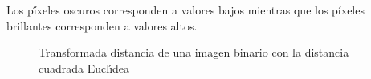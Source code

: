 Los p\'íxeles oscuros corresponden a valores bajos mientras que los p\'ixeles brillantes corresponden a valores altos.

\begin{figure}[h]
  \centering
  \caption{Transformada distancia de una imagen binario con la distancia cuadrada Euclı́dea}
  \label{imagen}
\end{figure}











